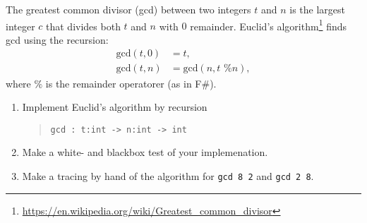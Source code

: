 \label{gcd} The greatest common divisor (gcd) between two integers $t$
and $n$ is the largest integer $c$ that divides both $t$ and $n$ with
$0$ remainder. Euclid's
algorithm\footnote{\url{https://en.wikipedia.org/wiki/Greatest_common_divisor}}
finds gcd using the recursion:
  \begin{align}
    \text{gcd}(t,0) &= t, \label{gcd:1}
    \\ \text{gcd}(t,n) &= \text{gcd}(n, t \text{ \% } n), \label{gcd:2}
  \end{align}
where $\%$ is the remainder operatorer (as in F\#). 
\begin{enumerate}
\item Implement Euclid's algorithm by recursion
  \begin{quote}
    \lstinline{gcd : t:int -> n:int -> int}
  \end{quote}
\item Make a white- and blackbox test of your implemenation.
\item Make a tracing by hand of the algorithm for \lstinline{gcd 8 2} and \lstinline{gcd 2 8}.
\end{enumerate}
